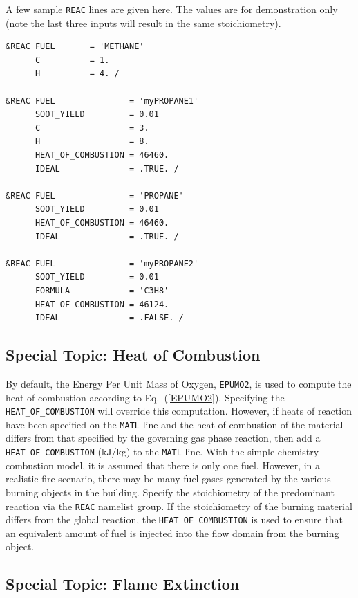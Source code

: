 \documentclass[11pt]{book}
\newcommand{\ct}{\tt\small}
\begin{document}
\noindent
A few sample {\ct REAC} lines are given here. The values are for demonstration only (note the last three inputs will result in the same stoichiometry).


\footnotesize
\begin{verbatim}
&REAC FUEL       = 'METHANE'
      C          = 1.
      H          = 4. /

&REAC FUEL               = 'myPROPANE1'
      SOOT_YIELD         = 0.01
      C                  = 3.
      H                  = 8.
      HEAT_OF_COMBUSTION = 46460.
      IDEAL              = .TRUE. /

&REAC FUEL               = 'PROPANE'
      SOOT_YIELD         = 0.01
      HEAT_OF_COMBUSTION = 46460.
      IDEAL              = .TRUE. /

&REAC FUEL               = 'myPROPANE2'
      SOOT_YIELD         = 0.01
      FORMULA            = 'C3H8'
      HEAT_OF_COMBUSTION = 46124.
      IDEAL              = .FALSE. /
\end{verbatim}
\normalsize




\subsection{Special Topic: Heat of Combustion}
\label{info:heat_of_combustion}

By default, the Energy Per Unit Mass of Oxygen, {\ct EPUMO2}, is used to compute the heat of combustion according to
Eq.~(\ref{EPUMO2}).  Specifying the
{\ct HEAT\_OF\_COMBUSTION} will override this computation.
However, if heats of reaction have been specified on the
{\ct MATL} line and
the heat of combustion of the material differs from that specified by
the governing gas phase reaction, then add a
{\ct HEAT\_OF\_COMBUSTION} (kJ/kg) to the {\ct MATL} line.
With the simple chemistry combustion
model, it is assumed that there is only one fuel. However, in a realistic
fire scenario, there may be many fuel gases generated by the various
burning objects in the building. Specify
the stoichiometry of the predominant reaction via the {\ct REAC}
namelist group. If the stoichiometry of the burning material
differs from the global reaction, the {\ct HEAT\_OF\_COMBUSTION} is
used to ensure that an equivalent amount of fuel is injected into the
flow domain from the burning object.

\subsection{Special Topic: Flame Extinction}
\end{document}
